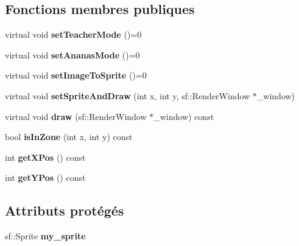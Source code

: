 \subsection*{Fonctions membres publiques}
\begin{DoxyCompactItemize}
\item 
\hypertarget{class_graphic_element_a236fbf61e8623a79c3ba3c154e8ebcdc}{virtual void {\bfseries set\-Teacher\-Mode} ()=0}\label{class_graphic_element_a236fbf61e8623a79c3ba3c154e8ebcdc}

\item 
\hypertarget{class_graphic_element_a8380da6f1b3db8d3bb1280b29f0a8e3c}{virtual void {\bfseries set\-Ananas\-Mode} ()=0}\label{class_graphic_element_a8380da6f1b3db8d3bb1280b29f0a8e3c}

\item 
\hypertarget{class_graphic_element_a36f73fee3d4548034a453ac48f80f102}{virtual void {\bfseries set\-Image\-To\-Sprite} ()=0}\label{class_graphic_element_a36f73fee3d4548034a453ac48f80f102}

\item 
\hypertarget{class_graphic_element_a7eb43ee4425ba80ea9865635c0f2e068}{virtual void {\bfseries set\-Sprite\-And\-Draw} (int x, int y, sf\-::\-Render\-Window $\ast$\-\_\-window)}\label{class_graphic_element_a7eb43ee4425ba80ea9865635c0f2e068}

\item 
\hypertarget{class_graphic_element_aadeb26c2c6e4f565b539da573c5c72c4}{virtual void {\bfseries draw} (sf\-::\-Render\-Window $\ast$\-\_\-window) const }\label{class_graphic_element_aadeb26c2c6e4f565b539da573c5c72c4}

\item 
\hypertarget{class_graphic_element_abb979d8b0590a0fc548a7698146179a2}{bool {\bfseries is\-In\-Zone} (int x, int y) const }\label{class_graphic_element_abb979d8b0590a0fc548a7698146179a2}

\item 
\hypertarget{class_graphic_element_a54dac49064cff360b8c5f97bfc66b9e3}{int {\bfseries get\-X\-Pos} () const }\label{class_graphic_element_a54dac49064cff360b8c5f97bfc66b9e3}

\item 
\hypertarget{class_graphic_element_abec2c4fe9aed0bb58b3b16747f9cbe3a}{int {\bfseries get\-Y\-Pos} () const }\label{class_graphic_element_abec2c4fe9aed0bb58b3b16747f9cbe3a}

\end{DoxyCompactItemize}
\subsection*{Attributs protégés}
\begin{DoxyCompactItemize}
\item 
\hypertarget{class_graphic_element_a4dc07a8f4481911bfe363bbf6f0b669a}{sf\-::\-Sprite {\bfseries my\-\_\-sprite}}\label{class_graphic_element_a4dc07a8f4481911bfe363bbf6f0b669a}

\end{DoxyCompactItemize}


